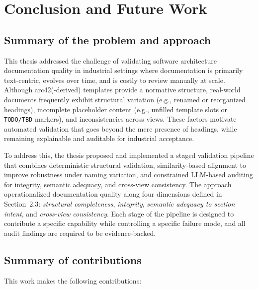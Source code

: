 \section{Conclusion and Future Work}
\label{sec:conclusion}

\subsection{Summary of the problem and approach}
\label{sec:conclusion_problem_approach}

This thesis addressed the challenge of validating software architecture documentation quality in industrial settings where documentation is primarily text-centric, evolves over time, and is costly to review manually at scale. Although arc42(-derived) templates provide a normative structure, real-world documents frequently exhibit structural variation (e.g., renamed or reorganized headings), incomplete placeholder content (e.g., unfilled template slots or \texttt{TODO/TBD} markers), and inconsistencies across views. These factors motivate automated validation that goes beyond the mere presence of headings, while remaining explainable and auditable for industrial acceptance.

To address this, the thesis proposed and implemented a staged validation pipeline that combines deterministic structural validation, similarity-based alignment to improve robustness under naming variation, and constrained LLM-based auditing for integrity, semantic adequacy, and cross-view consistency. The approach operationalized documentation quality along four dimensions defined in Section~2.3: \emph{structural completeness}, \emph{integrity}, \emph{semantic adequacy to section intent}, and \emph{cross-view consistency}. Each stage of the pipeline is designed to contribute a specific capability while controlling a specific failure mode, and all audit findings are required to be evidence-backed.

\subsection{Summary of contributions}
\label{sec:conclusion_contributions}

This work makes the following contributions:

